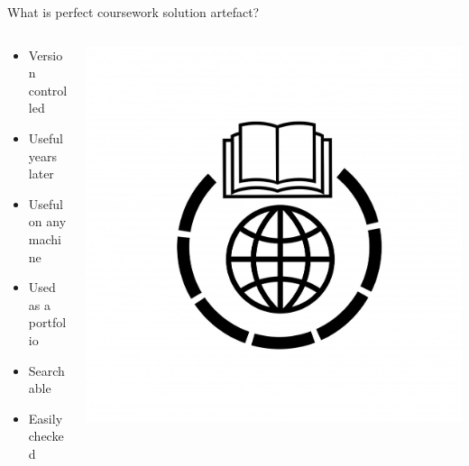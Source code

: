 \documentclass[presentation, CJK, compress,aspectratio=169]{beamer}
\begin{document}
\begin{frame}[label={sec:org3057351}]{What is perfect coursework solution artefact?}
\begin{columns}
\begin{column}{0.5\columnwidth}
\begin{itemize}
\item Version controlled
\item Useful years later
\item Useful on any machine
\item Used as a portfolio
\item Searchable
\item Easily checked
\end{itemize}
\end{column}

\begin{column}{0.30\columnwidth}
\begin{center}
\includegraphics[width=.9\linewidth]{ideal-format-book-ebook.jpeg}
\end{center}
\end{column}
\end{columns}


\end{frame}
\end{document}
